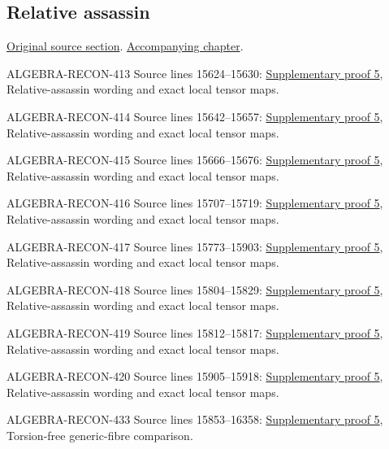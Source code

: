 \subsection{Relative assassin}
\hypertarget{algebra-source-section-relative-assassin}{}
\noindent\href{https://github.com/stacks/stacks-project/blob/a04446e57ec1fbc252a871afcec7752fb2807b14/algebra.tex\#L15616}{Original source section}. \href{algebra.pdf\#nameddest=section-relative-assassin}{Accompanying chapter}.

\begin{AlgebraSourceRoutes}
\item[ALGEBRA-RECON-413] Source lines 15624--15630: \hyperlink{algebra_symbolic_weakass_notes_20260927}{Supplementary proof 5}, Relative-assassin wording and exact local tensor maps.
\item[ALGEBRA-RECON-414] Source lines 15642--15657: \hyperlink{algebra_symbolic_weakass_notes_20260927}{Supplementary proof 5}, Relative-assassin wording and exact local tensor maps.
\item[ALGEBRA-RECON-415] Source lines 15666--15676: \hyperlink{algebra_symbolic_weakass_notes_20260927}{Supplementary proof 5}, Relative-assassin wording and exact local tensor maps.
\item[ALGEBRA-RECON-416] Source lines 15707--15719: \hyperlink{algebra_symbolic_weakass_notes_20260927}{Supplementary proof 5}, Relative-assassin wording and exact local tensor maps.
\item[ALGEBRA-RECON-417] Source lines 15773--15903: \hyperlink{algebra_symbolic_weakass_notes_20260927}{Supplementary proof 5}, Relative-assassin wording and exact local tensor maps.
\item[ALGEBRA-RECON-418] Source lines 15804--15829: \hyperlink{algebra_symbolic_weakass_notes_20260927}{Supplementary proof 5}, Relative-assassin wording and exact local tensor maps.
\item[ALGEBRA-RECON-419] Source lines 15812--15817: \hyperlink{algebra_symbolic_weakass_notes_20260927}{Supplementary proof 5}, Relative-assassin wording and exact local tensor maps.
\item[ALGEBRA-RECON-420] Source lines 15905--15918: \hyperlink{algebra_symbolic_weakass_notes_20260927}{Supplementary proof 5}, Relative-assassin wording and exact local tensor maps.
\item[ALGEBRA-RECON-433] Source lines 15853--16358: \hyperlink{algebra_symbolic_weakass_notes_20260927}{Supplementary proof 5}, Torsion-free generic-fibre comparison.
\end{AlgebraSourceRoutes}

